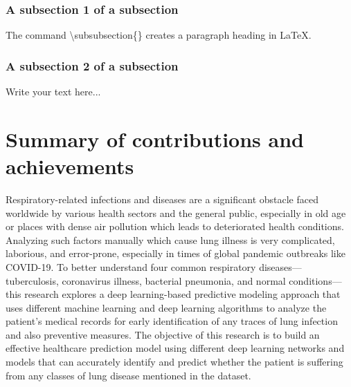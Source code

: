 \subsubsection{A subsection 1 of a subsection}
\label{sec:intro_some_subsub1}
The command \textbackslash subsubsection\{\} creates a paragraph heading in \LaTeX.

\subsubsection{A subsection 2 of a subsection}
\label{sec:intro_some_subsub2}
Write your text here...

\section{Summary of contributions and achievements} %
\label{sec:intro_sum_results} %
Respiratory-related infections and diseases are a significant obstacle faced worldwide by various health sectors and the general public, especially in old age or places with dense air pollution which leads to deteriorated health conditions. Analyzing such factors manually which cause lung illness is very complicated, laborious, and error-prone, especially in times of global pandemic outbreaks like COVID-19. To better understand four common respiratory diseases—tuberculosis, coronavirus illness, bacterial pneumonia, and normal conditions—this research explores a deep learning-based predictive modeling approach that uses different machine learning and deep learning algorithms to analyze the patient’s medical records for early identification of any traces of lung infection and also preventive measures. The objective of this research is to build an effective healthcare prediction model using different deep learning networks and models that can accurately identify and predict whether the patient is suffering from any classes of lung disease mentioned in the dataset. 







